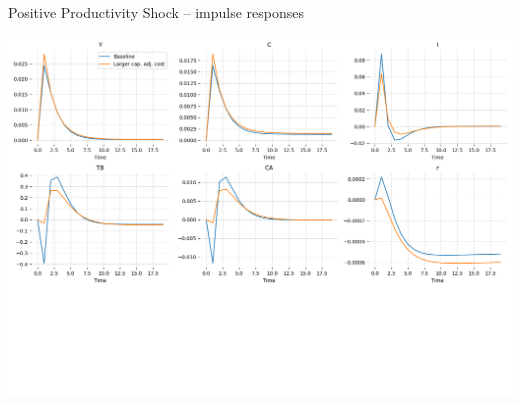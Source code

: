 \documentclass{beamer}
\newcommand{\tb}[1]{{\color{blue}{\textbf{#1}}}}
\begin{document}
%
%
%
%
%

\begin{frame}{Positive Productivity Shock -- impulse responses} 



\centering
\includegraphics[width = 0.99\linewidth]{FIGURES/SOE_RBC_6IRF.png} 


\end{frame}
\end{document}
